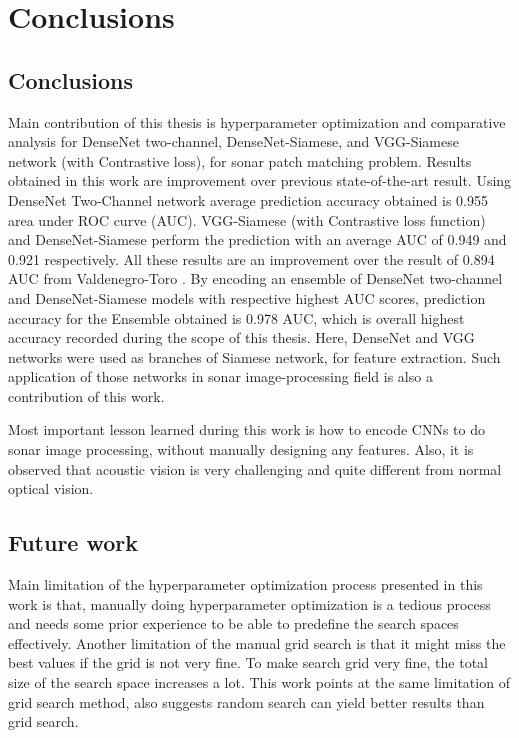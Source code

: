 
\chapter{Conclusions}
\label{chap:conclusions}
\section{Conclusions}
Main contribution of this thesis is hyperparameter optimization and comparative analysis for DenseNet two-channel, DenseNet-Siamese, and VGG-Siamese network (with Contrastive loss), for sonar patch matching problem.
Results obtained in this work are improvement over previous state-of-the-art result. Using DenseNet Two-Channel network average prediction accuracy obtained is 0.955 area under ROC curve (AUC). 
VGG-Siamese (with Contrastive loss function) and DenseNet-Siamese perform the prediction with an average 
AUC of 0.949 and 0.921 respectively. All these results are an improvement over the result of 0.894 AUC from Valdenegro-Toro \cite{stateoftheart}. By encoding an ensemble of DenseNet two-channel and DenseNet-Siamese 
models with respective highest AUC scores, prediction accuracy for the Ensemble obtained is 0.978 AUC, which is overall highest accuracy recorded during the scope of this thesis.
Here, DenseNet and VGG networks were used as branches of Siamese network, for feature extraction. Such application of those networks in sonar image-processing field is also a contribution of this work.

Most important lesson learned during this work is how to encode CNNs to do sonar image processing, without manually designing any features. Also, it is observed that acoustic vision is very challenging and quite different from normal 
optical vision. 

\section{Future work}
Main limitation of the hyperparameter optimization process presented in this work is that, manually doing hyperparameter optimization is a tedious process and needs some prior experience to be able to predefine 
the search spaces effectively. Another limitation of the manual grid search is that it might miss the best values if the grid is not very fine. To make search grid very fine, the total size of the search space increases a lot. 
This work \cite{bergstra2012random} points at the same limitation of grid search method, also suggests random search can yield better results than grid search.

